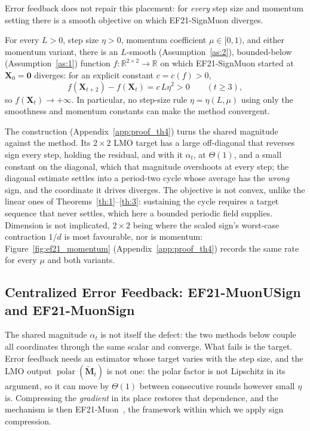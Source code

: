 Error feedback does not repair this placement: for \emph{every} step size and momentum setting there is a smooth objective on which EF21-SignMuon diverges.
\setcounter{theorem}{3}
\begin{theorem}\label{th:ef_div}
For every $L>0$, step size $\eta>0$, momentum coefficient $\mu\in[0,1)$, and either momentum variant, there is an $L$-smooth (Assumption~\ref{as:2}), bounded-below (Assumption~\ref{as:1}) function $f:\mathbb{R}^{2\times2}\!\to\mathbb{R}$ on which EF21-SignMuon started at $\mathbf{X}_0=\mathbf{0}$ diverges: for an explicit constant $c=c(f)>0$,
\begin{equation}\label{eq:exact_rate}
f(\mathbf{X}_{t+2})-f(\mathbf{X}_t)=c\,L\eta^2>0\qquad(t\ge3),
\end{equation}
so $f(\mathbf{X}_t)\to+\infty$. In particular, no step-size rule $\eta=\eta(L,\mu)$ using only the smoothness and momentum constants can make the method convergent.
\end{theorem}
The construction (Appendix~\ref{app:proof_th4}) turns the shared magnitude against the method. Its $2\times2$ LMO target has a large off-diagonal that reverses sign every step, holding the residual, and with it $\alpha_t$, at $\Theta(1)$, and a small constant on the diagonal, which that magnitude overshoots at every step; the diagonal estimate settles into a period-two cycle whose average has the \emph{wrong} sign, and the coordinate it drives diverges. The objective is not convex, unlike the linear ones of Theorems~\ref{th:1}--\ref{th:3}: sustaining the cycle requires a target sequence that never settles, which here a bounded periodic field supplies. Dimension is not implicated, $2\times2$ being where the scaled sign's worst-case contraction $1/d$ is most favourable, nor is momentum: Figure~\ref{fig:ef21_momentum} (Appendix~\ref{app:proof_th4}) records the same rate for every $\mu$ and both variants.

\subsection{Centralized Error Feedback: EF21-MuonUSign and EF21-MuonSign}
The shared magnitude $\alpha_t$ is not itself the defect: the two methods below couple all coordinates through the same scalar and converge. What fails is the target. Error feedback needs an estimator whose target varies with the step size, and the LMO output $\operatorname{polar}(\tilde{\mathbf{M}}_t)$ is not one: the polar factor is not Lipschitz in its argument, so it can move by $\Theta(1)$ between consecutive rounds however small $\eta$ is. Compressing the \emph{gradient} in its place restores that dependence, and the mechanism is then EF21-Muon~\cite{gruntkowska2025error}, the framework within which we apply sign compression.

